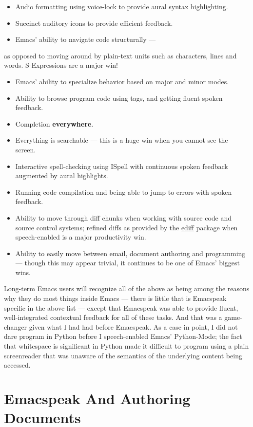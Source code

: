 \documentclass[11pt]{article}
\begin{document}
\begin{itemize}
\item Audio formatting using voice-lock to provide aural syntax
highlighting.
\item Succinct auditory icons to provide efficient feedback.
\item Emacs' ability to navigate code structurally   —
\end{itemize}
as opposed to
  moving around by plain-text units such as characters, lines
  and words. S-Expressions are a major win!
\begin{itemize}
\item Emacs' ability to specialize behavior based on major and
minor modes.
\item Ability to browse program code using  tags, and getting
fluent spoken feedback.
\item Completion \textbf{everywhere}.
\item Everything is searchable   —   this is a huge win when you
cannot see the screen.
\item Interactive spell-checking using ISpell with continuous
spoken feedback augmented by  aural highlights.
\item Running code compilation  and being able to jump to errors
with spoken feedback.
\item Ability to move through diff chunks when working with source
code and source control systems;  refined diffs as provided
by the \uline{ediff} package when speech-enabled is a major
productivity win.
\item Ability to easily move between email, document authoring and
programming   —   though this may appear trivial, it continues
to be one of Emacs' biggest wins.
\end{itemize}


Long-term Emacs users will recognize all of the above as  being
among the reasons why they do most things inside Emacs   —   there
is little that is Emacspeak specific in the above list   —   except
that Emacspeak was able to provide fluent, well-integrated
contextual feedback for all of these tasks. And that was a
game-changer given what I had had before Emacspeak. As a case in
point, I did not dare program in Python before  I speech-enabled
Emacs' Python-Mode; the fact that whitespace is significant in
Python made it difficult to program using a plain screenreader
that was unaware of the semantics of the underlying content being accessed.

\section{Emacspeak And Authoring Documents}
\label{sec-6}
\end{document}
